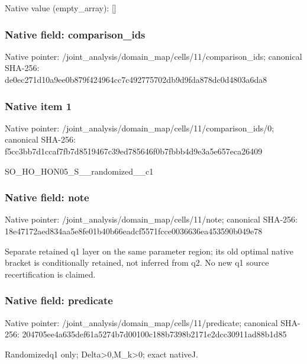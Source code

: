 \documentclass[10pt,a4paper]{article}
\begin{document}
Native value (empty\_\allowbreak{}array): []

\subsubsection{Native field: comparison\_\allowbreak{}ids}
Native pointer: /joint\_\allowbreak{}analysis/domain\_\allowbreak{}map/cells/11/comparison\_\allowbreak{}ids; canonical SHA-256: de0ec271d10a9ee0b879f424964cc7c492775702db9d9fda878dc0d4803a6da8

\subsubsection{Native item 1}
Native pointer: /joint\_\allowbreak{}analysis/domain\_\allowbreak{}map/cells/11/comparison\_\allowbreak{}ids/0; canonical SHA-256: f5cc3bb7d1ccaf7fb7d8519467c39ed785646f0b7fbbb4d9e3a5e657eca26409

\begingroup\raggedright\sloppy SO\_\allowbreak{}HO\_\allowbreak{}HON05\_\allowbreak{}S\_\allowbreak{}\_\allowbreak{}randomized\_\allowbreak{}\_\allowbreak{}c1\par\endgroup

\subsubsection{Native field: note}
Native pointer: /joint\_\allowbreak{}analysis/domain\_\allowbreak{}map/cells/11/note; canonical SHA-256: 18e47172aed834aa5e8fe01b40b66eadcf5571fcce0036636ea453590b049e78

\begingroup\raggedright\sloppy Separate retained q1 layer on the same parameter region;\allowbreak{} its old optimal native bracket is conditionally retained,\allowbreak{} not inferred from q2. No new q1 source recertification is claimed.\par\endgroup

\subsubsection{Native field: predicate}
Native pointer: /joint\_\allowbreak{}analysis/domain\_\allowbreak{}map/cells/11/predicate; canonical SHA-256: 204705ee4a635def61a5274b7d00100c188b7398b2171e2dcc30911ad88b1d85

\begingroup\raggedright\sloppy Randomizedq1 only;\allowbreak{} Delta>0,\allowbreak{}M\_\allowbreak{}k>0;\allowbreak{} exact nativeJ.\par\endgroup
\end{document}
